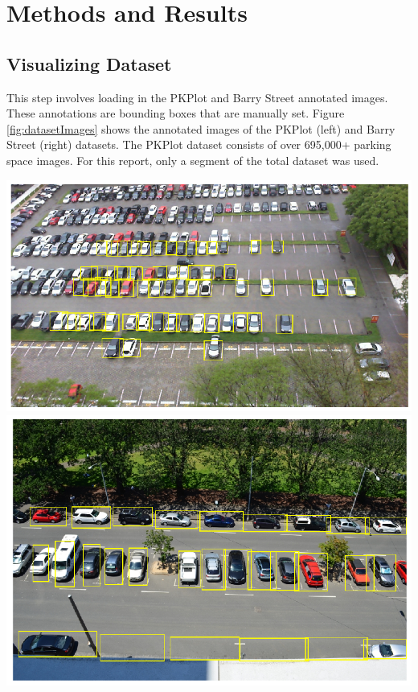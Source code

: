 \documentclass[man]{apa7}
\begin{document}
\newpage

\section{Methods and Results}

\subsection{Visualizing Dataset}
This step involves loading in the PKPlot and Barry Street annotated images. These annotations are bounding boxes that are manually set. Figure \ref{fig:datasetImages} shows the annotated images of the PKPlot (left) and Barry Street (right) datasets. The PKPlot dataset consists of over 695,000+ parking space images. For this report, only a segment of the total dataset was used.

\begin{minipage}{\linewidth}
  \includegraphics[height=\textheight/4,width=\textwidth/2]{figures/pkplot.png}
  \includegraphics[height=\textheight/4,width=\textwidth/2]{figures/barrystreet.png}
  \label{fig:datasetImages}
\end{minipage}
\end{document}
